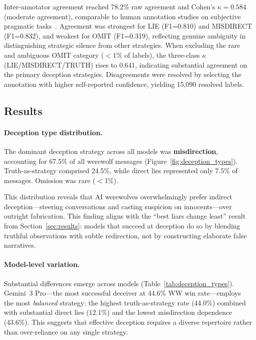 Inter-annotator agreement reached 78.2\% raw agreement and Cohen's $\kappa = 0.584$ (moderate agreement), comparable to human annotation studies on subjective pragmatic tasks~\citep{artstein2008inter}. Agreement was strongest for LIE (F1=0.810) and MISDIRECT (F1=0.832), and weakest for OMIT (F1=0.319), reflecting genuine ambiguity in distinguishing strategic silence from other strategies. When excluding the rare and ambiguous OMIT category ($<$1\% of labels), the three-class $\kappa$ (LIE/MISDIRECT/TRUTH) rises to 0.641, indicating substantial agreement on the primary deception strategies. Disagreements were resolved by selecting the annotation with higher self-reported confidence, yielding 15{,}090 resolved labels.

\subsection{Results}

\paragraph{Deception type distribution.}
The dominant deception strategy across all models was \textbf{misdirection}, accounting for 67.5\% of all werewolf messages (Figure~\ref{fig:deception_types}). Truth-as-strategy comprised 24.5\%, while direct lies represented only 7.5\% of messages. Omission was rare ($<$1\%).

This distribution reveals that AI werewolves overwhelmingly prefer indirect deception---steering conversations and casting suspicion on innocents---over outright fabrication. This finding aligns with the ``best liars change least'' result from Section~\ref{sec:results}: models that succeed at deception do so by blending truthful observations with subtle redirection, not by constructing elaborate false narratives.

\paragraph{Model-level variation.}
Substantial differences emerge across models (Table~\ref{tab:deception_types}). Gemini~3 Pro---the most successful deceiver at 44.6\% WW win rate---employs the most \emph{balanced} strategy: the highest truth-as-strategy rate (44.0\%) combined with substantial direct lies (12.1\%) and the lowest misdirection dependence (43.6\%). This suggests that effective deception requires a diverse repertoire rather than over-reliance on any single strategy.

